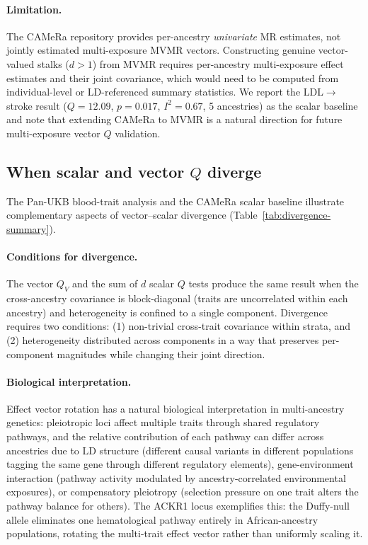 \documentclass[11pt]{article}
\begin{document}
\paragraph{Limitation.}
The CAMeRa repository provides per-ancestry \emph{univariate} MR estimates, not jointly estimated multi-exposure MVMR vectors. Constructing genuine vector-valued stalks ($d > 1$) from MVMR requires per-ancestry multi-exposure effect estimates and their joint covariance, which would need to be computed from individual-level or LD-referenced summary statistics. We report the LDL$\to$stroke result ($Q = 12.09$, $p = 0.017$, $I^2 = 0.67$, 5 ancestries) as the scalar baseline and note that extending CAMeRa to MVMR is a natural direction for future multi-exposure vector $Q$ validation.

\subsection{When scalar and vector $Q$ diverge}
\label{sec:vector-divergence}

The Pan-UKB blood-trait analysis and the CAMeRa scalar baseline illustrate complementary aspects of vector--scalar divergence (Table~\ref{tab:divergence-summary}).

\paragraph{Conditions for divergence.}
The vector $Q_V$ and the sum of $d$ scalar $Q$ tests produce the same result when the cross-ancestry covariance is block-diagonal (traits are uncorrelated within each ancestry) and heterogeneity is confined to a single component. Divergence requires two conditions: (1) non-trivial cross-trait covariance within strata, and (2) heterogeneity distributed across components in a way that preserves per-component magnitudes while changing their joint direction.

\paragraph{Biological interpretation.}
Effect vector rotation has a natural biological interpretation in multi-ancestry genetics: pleiotropic loci affect multiple traits through shared regulatory pathways, and the relative contribution of each pathway can differ across ancestries due to LD structure (different causal variants in different populations tagging the same gene through different regulatory elements), gene-environment interaction (pathway activity modulated by ancestry-correlated environmental exposures), or compensatory pleiotropy (selection pressure on one trait alters the pathway balance for others). The ACKR1 locus exemplifies this: the Duffy-null allele eliminates one hematological pathway entirely in African-ancestry populations, rotating the multi-trait effect vector rather than uniformly scaling it.
\end{document}
